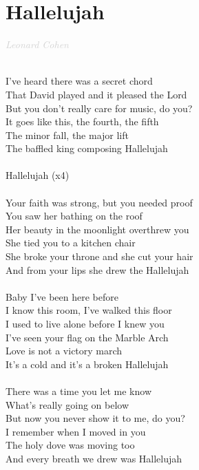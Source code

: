 \documentclass[a5paper, 10pt]{book}
\begin{document}
\section{Hallelujah}\textcolor{lightgray}{\textit{Leonard Cohen}}\\~\\
\begin{minipage}[t]{0.8\textwidth}
  I've heard there was a secret chord\\
  That David played and it pleased the Lord\\
  But you don't really care for music, do you?\\
  It goes like this, the fourth, the fifth\\
  The minor fall, the major lift\\
  The baffled king composing Hallelujah\\
  \\
  \hspace*{6mm}Hallelujah (x4)\\
  \\
  Your faith was strong, but you needed proof\\
  You saw her bathing on the roof\\
  Her beauty in the moonlight overthrew you\\
  She tied you to a kitchen chair\\
  She broke your throne and she cut your hair\\
  And from your lips she drew the Hallelujah\\
  \\
  Baby I've been here before\\
  I know this room, I've walked this floor\\
  I used to live alone before I knew you\\
  I've seen your flag on the Marble Arch\\
  Love is not a victory march\\
  It's a cold and it's a broken Hallelujah\\
  \\
  There was a time you let me know\\
  What's really going on below\\
  But now you never show it to me, do you?\\
  I remember when I moved in you\\
  The holy dove was moving too\\
  And every breath we drew was Hallelujah\\

\end{minipage}
\end{document}
